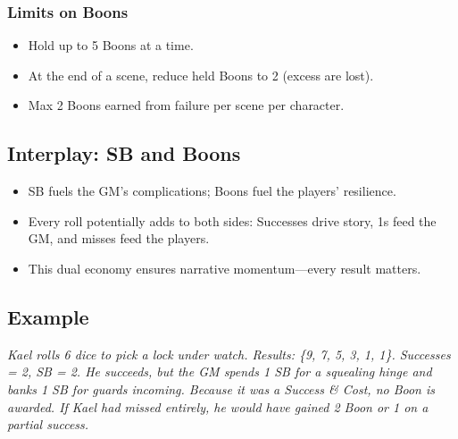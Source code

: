\subsubsection{Limits on Boons}
\begin{itemize}
  \item Hold up to 5 Boons at a time.
  \item At the end of a scene, reduce held Boons to 2 (excess are lost).
  \item Max 2 Boons earned from failure per scene per character.
\end{itemize}

\subsection{Interplay: SB and Boons}
\begin{itemize}
  \item SB fuels the GM’s complications; Boons fuel the players’ resilience.
  \item Every roll potentially adds to both sides: Successes drive story, 1s feed the GM, and misses feed the players.
  \item This dual economy ensures narrative momentum—every result matters.
\end{itemize}

\subsection{Example}
\emph{Kael rolls 6 dice to pick a lock under watch. Results: \{9, 7, 5, 3, 1, 1\}. Successes = 2, SB = 2. He succeeds, but the GM spends 1 SB for a squealing hinge and banks 1 SB for guards incoming. Because it was a Success \& Cost, no Boon is awarded. If Kael had missed entirely, he would have gained 2 Boon or 1 on a partial success.}
